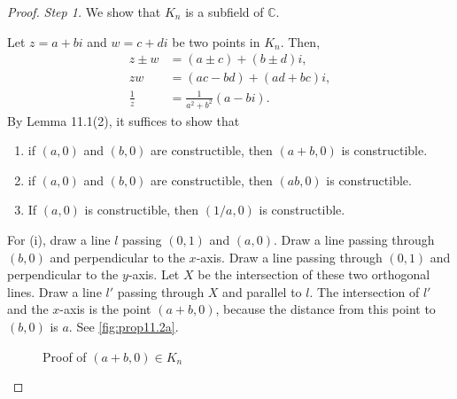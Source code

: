 \documentclass[twoside]{article}
\newcommand\C{\mathbb C}
\theoremstyle{remark}
\begin{document}
\begin{proof}
  \emph{Step 1.} We show that \(K_n\) is a subfield of \(\C\).
  
  Let \(z = a+bi\) and \(w = c+di\) be two points in \(K_n\). Then,
  \begin{align*}
    z \pm w & = (a \pm c) + (b \pm d)i, \\
    zw & = (ac-bd) + (ad+bc)i, \\
    \frac1z & = \frac1{a^2+b^2}(a-bi).
  \end{align*}
  By Lemma 11.1(2), it suffices to show that
  \begin{enumerate}[label=(\roman*),nosep]
    \item if \((a,0)\) and \((b,0)\) are constructible, then \((a+b,0)\) is constructible.
    \item if \((a,0)\) and \((b,0)\) are constructible, then \((ab,0)\) is constructible.
    \item If \((a,0)\) is constructible, then \((1/a,0)\) is constructible.
  \end{enumerate}
  
  For (i), draw a line \(l\) passing \((0,1)\) and \((a,0)\). Draw a line passing through \((b,0)\) and perpendicular to the \(x\)-axis. Draw a line passing through \((0,1)\) and perpendicular to the \(y\)-axis. Let \(X\) be the intersection of these two orthogonal lines. Draw a line \(l'\) passing through \(X\) and parallel to \(l\). The intersection of \(l'\) and the \(x\)-axis is the point \((a+b,0)\), because the distance from this point to \((b,0)\) is \(a\). See \autoref{fig:prop11.2a}.
  \begin{figure}[ht]
    \centering
    \caption{Proof of \((a+b,0) \in K_n\)}\label{fig:prop11.2a}
  \end{figure}
  

\end{proof}
\end{document}
